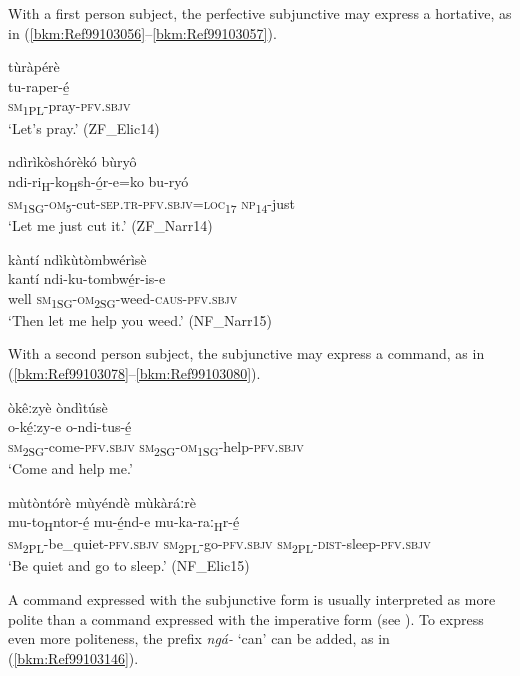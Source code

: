 With a first person subject, the perfective subjunctive may express a hortative, as in (\ref{bkm:Ref99103056}--\ref{bkm:Ref99103057}).

\ea
\label{bkm:Ref99103056}
\glll tùràpérè\\
tu-raper-é̲\\
\textsc{sm}\textsubscript{1PL}-pray-\textsc{pfv}.\textsc{sbjv}\\
\glt ‘Let’s pray.’ (ZF\_Elic14)
\z

\ea
ndìrìkòshórèkó bùryô\\
\gll ndi-ri\textsubscript{H}-ko\textsubscript{H}sh-ó̲r-e=ko      bu-ryó\\
\textsc{sm}\textsubscript{1SG}-\textsc{om}\textsubscript{5}-cut-\textsc{sep}.\textsc{tr}-\textsc{pfv}.\textsc{sbjv}=\textsc{loc}\textsubscript{17}  \textsc{np}\textsubscript{14}-just\\
\glt ‘Let me just cut it.’ (ZF\_Narr14)
\z

\ea
\label{bkm:Ref99103057}
kàntí ndìkùtòmbwérìsè\\
\gll kantí  ndi-ku-tombwé̲r-is-e\\
well  \textsc{sm}\textsubscript{1SG}-\textsc{om}\textsubscript{2SG}-weed-\textsc{caus}-\textsc{pfv}.\textsc{sbjv}\\
\glt ‘Then let me help you weed.’ (NF\_Narr15)
\z

With a second person subject, the subjunctive may express a command, as in (\ref{bkm:Ref99103078}--\ref{bkm:Ref99103080}).

\ea
\label{bkm:Ref99103078}
òkêːzyè òndìtúsè\\
\gll o-ké̲ːzy-e      o-ndi-tus-é̲\\
\textsc{sm}\textsubscript{2SG}-come-\textsc{pfv}.\textsc{sbjv}  \textsc{sm}\textsubscript{2SG}-\textsc{om}\textsubscript{1SG}-help-\textsc{pfv}.\textsc{sbjv}\\
\glt ‘Come and help me.’
\z

\ea
\label{bkm:Ref99103080}
mùtòntórè mùyéndè mùkàráːrè\\
\gll mu-to\textsubscript{H}ntor-é̲    mu-é̲nd-e    mu-ka-raː\textsubscript{H}r-é̲\\
\textsc{sm}\textsubscript{2PL}-be\_quiet-\textsc{pfv}.\textsc{sbjv}  \textsc{sm}\textsubscript{2PL}-go-\textsc{pfv}.\textsc{sbjv}  \textsc{sm}\textsubscript{2PL}-\textsc{dist}-sleep-\textsc{pfv}.\textsc{sbjv}\\
\glt ‘Be quiet and go to sleep.’ (NF\_Elic15)
\z

A command expressed with the subjunctive form is usually interpreted as more polite than a command expressed with the imperative form (see ). To express even more politeness, the prefix \textit{ngá-} ‘can’ can be added, as in (\ref{bkm:Ref99103146}).

